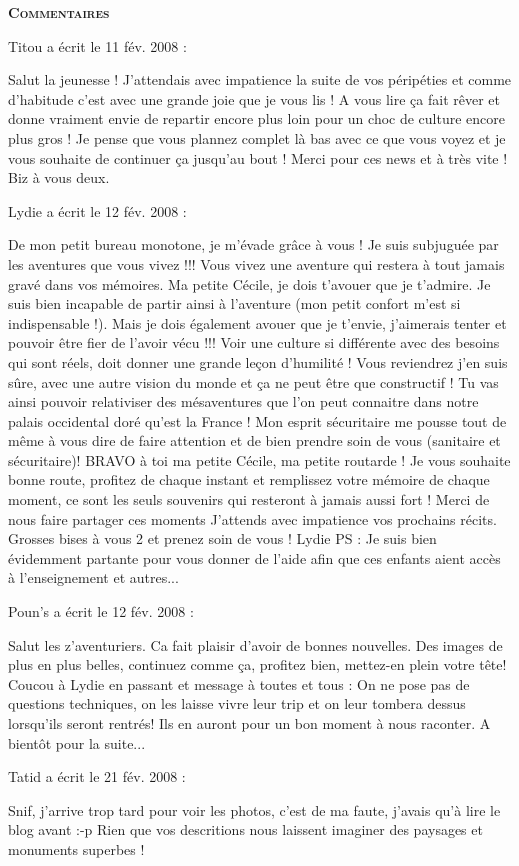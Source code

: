 \bigskip
\textbf{\textsc{Commentaires}}

\medskip
Titou a écrit le 11 fév. 2008 :
\begin{displayquote}
Salut la jeunesse ! J'attendais avec impatience la suite de vos péripéties et comme d'habitude c'est avec une grande joie que je vous lis ! A vous lire ça fait rêver et donne vraiment envie de repartir encore plus loin pour un choc de culture encore plus gros ! Je pense que vous plannez complet là bas avec ce que vous voyez et je vous souhaite de continuer ça jusqu'au bout ! Merci pour ces news et à très vite ! Biz à vous deux.
\end{displayquote}

\medskip
Lydie a écrit le 12 fév. 2008 :
\begin{displayquote}
De mon petit bureau monotone, je m'évade grâce à vous !
Je suis subjuguée par les aventures que vous vivez !!!
Vous vivez une aventure qui restera à tout jamais gravé dans vos mémoires.
Ma petite Cécile, je dois t'avouer que je t'admire. Je suis bien incapable de partir ainsi à l'aventure (mon petit confort m'est si indispensable !).
Mais je dois également avouer que je t'envie, j'aimerais tenter et pouvoir être fier de l'avoir vécu !!!
Voir une culture si différente avec des besoins qui sont réels, doit donner une grande leçon d'humilité !
Vous reviendrez j'en suis sûre, avec une autre vision du monde et ça ne peut être que constructif !
Tu vas ainsi pouvoir relativiser des mésaventures que l'on peut connaitre dans notre palais occidental doré qu'est la France !
Mon esprit sécuritaire me pousse tout de même à vous dire de faire attention et de bien prendre soin de vous (sanitaire et sécuritaire)!
BRAVO à toi ma petite Cécile, ma petite routarde !
Je vous souhaite bonne route, profitez de chaque instant et remplissez votre mémoire de chaque moment, ce sont les seuls souvenirs qui resteront à jamais aussi fort !
Merci de nous faire partager ces moments
J'attends avec impatience vos prochains récits.
Grosses bises à vous 2 et prenez soin de vous !
Lydie
PS : Je suis bien évidemment partante pour vous donner de l'aide afin que ces enfants aient accès à l'enseignement et autres...
\end{displayquote}

\medskip
Poun's a écrit le 12 fév. 2008 :
\begin{displayquote}
Salut les z'aventuriers. Ca fait plaisir d'avoir de bonnes nouvelles. Des images de plus en plus belles, continuez comme ça, profitez bien, mettez-en plein votre tête!
Coucou à Lydie en passant et message à toutes et tous :
On ne pose pas de questions techniques, on les laisse vivre leur trip et on leur tombera dessus lorsqu'ils seront rentrés! Ils en auront pour un bon moment à nous raconter.
A bientôt pour la suite...
\end{displayquote}

\medskip
Tatid a écrit le 21 fév. 2008 :
\begin{displayquote}
Snif, j'arrive trop tard pour voir les photos, c'est de ma faute, j'avais qu'à lire le blog avant :-p
Rien que vos descritions nous laissent imaginer des paysages et monuments superbes !
\end{displayquote}

\vfill
